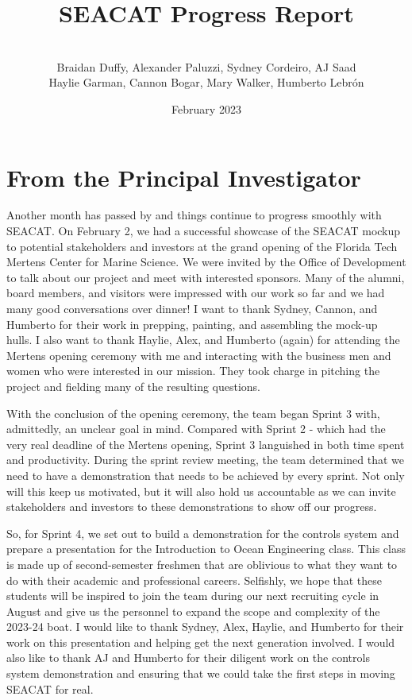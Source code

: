 \documentclass[12pt]{article}
\title{SEACAT Progress Report}
\author{
\\
    Braidan Duffy, Alexander Paluzzi, Sydney Cordeiro, AJ Saad\\ 
    Haylie Garman, Cannon Bogar, Mary Walker, Humberto Lebrón }
\date{February 2023}
\begin{document}
\maketitle

\tableofcontents 
\pagebreak

\setlength\parskip{1em plus 0.1em minus 0.2em}

\section*{From the Principal Investigator} %
    Another month has passed by and things continue to progress smoothly with SEACAT.
    On February 2, we had a successful showcase of the SEACAT mockup to potential stakeholders and investors at the grand opening of the Florida Tech Mertens Center for Marine Science.
    We were invited by the Office of Development to talk about our project and meet with interested sponsors.
    Many of the alumni, board members, and visitors were impressed with our work so far and we had many good conversations over dinner!
    I want to thank Sydney, Cannon, and Humberto for their work in prepping, painting, and assembling the mock-up hulls.
    I also want to thank Haylie, Alex, and Humberto (again) for attending the Mertens opening ceremony with me and interacting with the business men and women who were interested in our mission.
    They took charge in pitching the project and fielding many of the resulting questions.

    With the conclusion of the opening ceremony, the team began Sprint 3 with, admittedly, an unclear goal in mind. 
    Compared with Sprint 2 - which had the very real deadline of the Mertens opening, Sprint 3 languished in both time spent and productivity.
    During the sprint review meeting, the team determined that we need to have a demonstration that needs to be achieved by every sprint.
    Not only will this keep us motivated, but it will also hold us accountable as we can invite stakeholders and investors to these demonstrations to show off our progress.

    So, for Sprint 4, we set out to build a demonstration for the controls system and prepare a presentation for the Introduction to Ocean Engineering class.
    This class is made up of second-semester freshmen that are oblivious to what they want to do with their academic and professional careers.
    Selfishly, we hope that these students will be inspired to join the team during our next recruiting cycle in August and give us the personnel to expand the scope and complexity of the 2023-24 boat.
    I would like to thank Sydney, Alex, Haylie, and Humberto for their work on this presentation and helping get the next generation involved.
    I would also like to thank AJ and Humberto for their diligent work on the controls system demonstration and ensuring that we could take the first steps in moving SEACAT for real.
\end{document}
